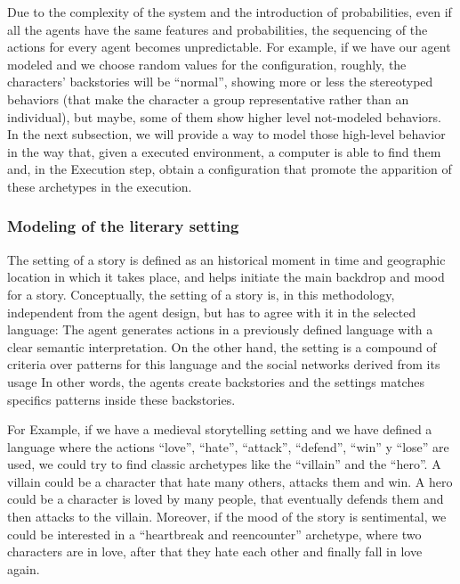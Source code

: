 \documentclass{sig-alternate}
\begin{document}

Due to the complexity of the system and the introduction of probabilities, even if all the agents have the same features and probabilities, the sequencing of the actions for every agent becomes unpredictable. For example, if we have our agent modeled and we choose random values for the configuration, roughly, the characters' backstories will be ``normal'', showing more or less the stereotyped behaviors (that make the character a group representative rather than an individual), but maybe, some of them show higher level not-modeled behaviors. In the next subsection, we will provide a way to model those high-level behavior in the way that, given a executed environment, a computer is able to find them 
and, in the Execution step, obtain a configuration that promote the apparition of these archetypes in the execution.

\subsubsection{Modeling of the literary setting}


The setting of a story is defined as an historical moment in time and geographic location in which it takes place, and helps initiate the main backdrop and mood for a story.
Conceptually, the setting of a story is, in this methodology, independent from the agent design, but has to agree with it in the selected language: 
The agent generates actions in a previously defined language with a clear semantic interpretation. On the other hand, the setting is a compound of criteria over patterns for this language and the social networks derived from its usage In other words, the agents create backstories and the settings matches specifics patterns inside these backstories.

For Example, if we have a medieval storytelling setting and we have defined a language where the actions ``love'', ``hate'', ``attack'', ``defend'', ``win'' y ``lose'' are used, we could try to find classic 
archetypes like the ``villain'' and the ``hero''. A villain could be a character that hate many others, attacks them and win. A hero could be a character is loved by many people, that eventually defends them and then attacks to the villain. Moreover, if the mood of the story is sentimental, we could be interested in a ``heartbreak and reencounter'' archetype, where two characters are in love, after that they hate each other and finally fall in love again.
\end{document}
